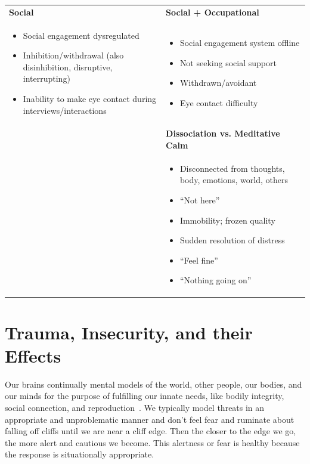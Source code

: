 \documentclass[11pt,oneside]{book}
\newenvironment{compactitemize}
{\begin{itemize}[nosep, leftmargin=1em, itemsep=0pt, topsep=0pt]}
{\end{itemize}}
\let\cite\parencite
\begin{document}
\begin{longtable}{>{\raggedright\arraybackslash}p{}|>{\raggedright\arraybackslash}p{}}
\addlinespace[1em]
\textbf{Social} & \textbf{Social + Occupational} \\
\begin{compactitemize}
\item Social engagement dysregulated
\item Inhibition/withdrawal (also disinhibition, disruptive, interrupting)
\item Inability to make eye contact during interviews/interactions
\end{compactitemize}
&
\begin{compactitemize}
\item Social engagement system offline
\item Not seeking social support
\item Withdrawn/avoidant
\item Eye contact difficulty
\end{compactitemize} \\

\addlinespace[1em]
& \textbf{Dissociation vs. Meditative Calm} \\
&
\begin{compactitemize}
\item Disconnected from thoughts, body, emotions, world, others
\item \enquote{Not here}
\item Immobility; frozen quality
\item Sudden resolution of distress
\item \enquote{Feel fine}
\item \enquote{Nothing going on}
\end{compactitemize} \\

\end{longtable}

\section{Trauma, Insecurity, and their Effects}
\label{sec:trauma}
Our brains continually mental models of the world, other people, our bodies, and our minds for the purpose of fulfilling our innate needs, like bodily integrity, social connection, and reproduction~\cite{clark2015surfing}. We typically model threats in an appropriate and unproblematic manner and don't feel fear and ruminate about falling off cliffs until we are near a cliff edge. Then the closer to the edge we go, the more alert and cautious we become. This alertness or fear is healthy because the response is situationally appropriate.
\end{document}
